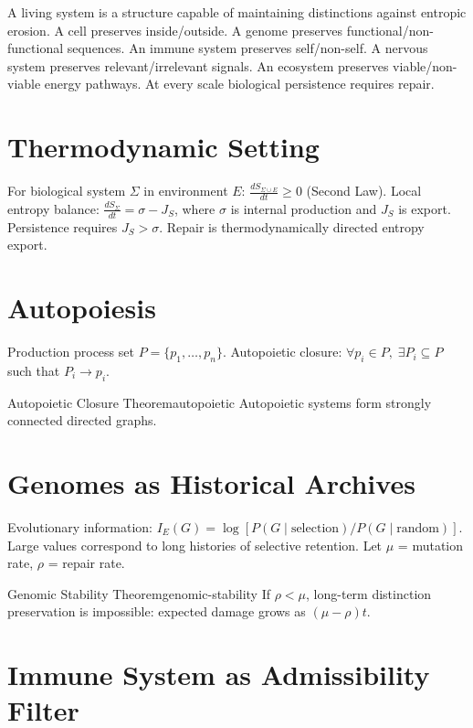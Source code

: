 \documentclass[12pt,twoside,openright]{book}
\begin{document}
A living system is a structure capable of maintaining
distinctions against entropic erosion.
A cell preserves inside/outside.
A genome preserves functional/non-functional sequences.
An immune system preserves self/non-self.
A nervous system preserves relevant/irrelevant signals.
An ecosystem preserves viable/non-viable energy pathways.
At every scale biological persistence requires repair.

\section{Thermodynamic Setting}

For biological system $\Sigma$ in environment $E$:
$\frac{dS_{\Sigma \cup E}}{dt} \ge 0$ (Second Law).
Local entropy balance:
$\frac{dS_\Sigma}{dt} = \sigma - J_S$,
where $\sigma$ is internal production and $J_S$ is export.
Persistence requires $J_S > \sigma$.
Repair is thermodynamically directed entropy export.

\section{Autopoiesis}

Production process set $P = \{p_1,\ldots,p_n\}$.
Autopoietic closure: $\forall p_i \in P,\; \exists P_i
\subseteq P$ such that $P_i \to p_i$.

\begin{theorem}{Autopoietic Closure Theorem}{autopoietic}
  Autopoietic systems form strongly connected directed
  graphs.
\end{theorem}

\section{Genomes as Historical Archives}

Evolutionary information:
$I_E(G) = \log[P(G \mid \text{selection})/P(G \mid \text{random})]$.
Large values correspond to long histories of selective
retention. Let $\mu$ = mutation rate, $\rho$ = repair rate.

\begin{theorem}{Genomic Stability Theorem}{genomic-stability}
  If $\rho < \mu$, long-term distinction preservation
  is impossible: expected damage grows as $(\mu-\rho)t$.
\end{theorem}

\section{Immune System as Admissibility Filter}
\end{document}
